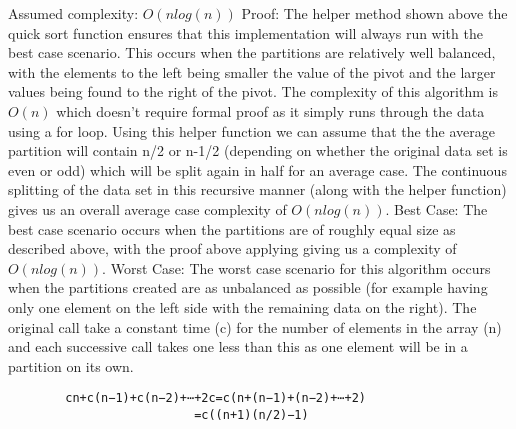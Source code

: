 \documentclass{article}
\begin{document}
Assumed complexity: \begin{math}O(nlog(n)) \end{math}
\newline\newline\newline
Proof:
\newline
The helper method shown above the quick sort function ensures that this implementation will always run with the best case scenario. This occurs when the partitions are relatively well balanced, with the elements to the left being smaller the value of the pivot and the larger values being found to the right of the pivot. The complexity of this algorithm is \begin{math}O(n)\end{math} which doesn't require formal proof as it simply runs through the data using a for loop. Using this helper function we can assume that the the average partition will contain n/2 or n-1/2 (depending on whether the original data set is even or odd) which will be split again in half for an average case. The continuous splitting of the data set in this recursive manner (along with the helper function) gives us an overall average case complexity of \begin{math}O(nlog(n))\end{math}.
\newline\newline
Best Case:
\newline
The best case scenario occurs when the partitions are of roughly equal size as described above, with the proof above applying giving us a complexity of\begin{math}O(nlog(n))\end{math}.
\newline\newline
Worst Case:
\newline
The worst case scenario for this algorithm occurs when the partitions created are as unbalanced as possible (for example having only one element on the left side with the remaining data on the right). The original call take a constant time (c) for the number of elements in the array (n) and each successive call takes one less than this as one element will be in a partition on its own.
\newline
\begin{verbatim}
        cn+c(n−1)+c(n−2)+⋯+2c=c(n+(n−1)+(n−2)+⋯+2)
                          =c((n+1)(n/2)−1)
\end{verbatim}
\newline\newline
\end{document}
